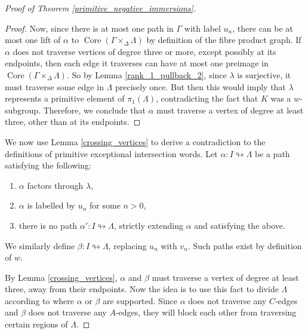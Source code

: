 \documentclass[11pt, a4paper]{amsart}
\theoremstyle{definition}
\def\immerses{\looparrowright}
\DeclareMathOperator{\core}{Core}
\begin{document}
\begin{proof}[Proof of Theorem \ref{primitive_negative_immersions}]
\begin{proof}
Now, since there is at most one path in $\Gamma$ with label $u_n$, there can be at most one lift of $\alpha$ to $\core(\Gamma\times_{\Delta}\Lambda)$ by definition of the fibre product graph. If $\alpha$ does not traverse vertices of degree three or more, except possibly at its endpoints, then each edge it traverses can have at most one preimage in $\core(\Gamma\times_{\Delta}\Lambda)$. So by Lemma \ref{rank_1_pullback_2}, since $\lambda$ is surjective, it must traverse some edge in $\Lambda$ precisely once. But then this would imply that $\lambda$ represents a primitive element of $\pi_1(\Lambda)$, contradicting the fact that $K$ was a $w$-subgroup. Therefore, we conclude that $\alpha$ must traverse a vertex of degree at least three, other than at its endpoints.
\end{proof}

We now use Lemma \ref{crossing_vertices} to derive a contradiction to the definitions of primitive exceptional intersection words. Let $\alpha:I\immerses \Lambda$ be a path satisfying the following:
\begin{enumerate}
\item $\alpha$ factors through $\lambda$,
\item $\alpha$ is labelled by $u_n$ for some $n> 0$,
\item there is no path $\alpha':I\immerses\Lambda$, strictly extending $\alpha$ and satisfying the above.
\end{enumerate}
We similarly define $\beta:I\immerses \Lambda$, replacing $u_n$ with $v_n$. Such paths exist by definition of $w$.

By Lemma \ref{crossing_vertices}, $\alpha$ and $\beta$ must traverse a vertex of degree at least three, away from their endpoints. Now the idea is to use this fact to divide $\Lambda$ according to where $\alpha$ or $\beta$ are supported. Since $\alpha$ does not traverse any $C$-edges and $\beta$ does not traverse any $A$-edges, they will block each other from traversing certain regions of $\Lambda$. 


\end{proof}
\end{document}

